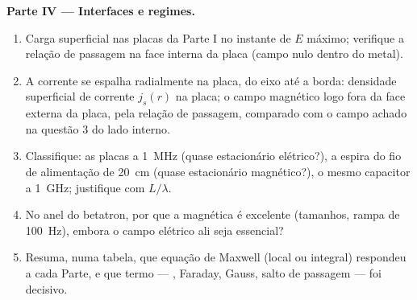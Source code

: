 \begin{problem}
\medskip
\noindent\textbf{Parte IV --- Interfaces e regimes.}
\begin{enumerate}[resume]
  \item Carga superficial nas placas da Parte I no instante de
        $E$ máximo; verifique a relação de passagem na face interna da
        placa (campo nulo dentro do metal).
  \item A corrente se espalha radialmente na placa, do eixo até
        a borda: densidade superficial de corrente $j_s(r)$ na placa; o
        campo magnético logo fora da face externa da placa, pela
        relação de passagem, comparado com o campo achado na questão 3
        do lado interno.
  \item Classifique: as placas a \qty{1}{MHz} (quase estacionário elétrico?), a espira
        do fio de alimentação de \qty{20}{cm} (quase estacionário magnético?), o mesmo capacitor a
        \qty{1}{GHz}; justifique com $L/\lambda$.
  \item No anel do betatron, por que a 
        magnética é excelente (tamanhos, rampa de \qty{100}{Hz}), embora o
        campo elétrico ali seja essencial?
  \item Resuma, numa tabela, que equação de Maxwell (local ou
        integral) respondeu a cada Parte, e que termo --- , Faraday, Gauss, salto de passagem --- foi decisivo.
\end{enumerate}
\end{problem}
